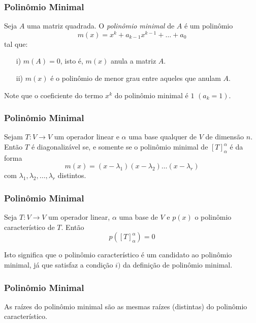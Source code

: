 \documentclass[hyperref={pdfpagelabels=false}]{beamer}
\begin{document}
\begin{frame}
\frametitle{Polinômio Minimal}

\begin{definition}
	Seja $A$ uma matriz quadrada. O \emph{polinômio minimal} de $A$ é um polinômio
	$$m(x) = x^k + a_{k-1}x^{k-1} + \dots + a_0$$
	tal que:
	\begin{enumerate}
		\item [i)] $m(A) = 0$, isto é, $m(x)$ anula a matriz $A$.
		\item [ii)] $m(x)$ é o polinômio de menor grau entre aqueles que anulam $A$.
	\end{enumerate}
	Note que o coeficiente do termo $x^k$ do polinômio minimal é $1$ $(a_k = 1)$.
	
\end{definition}

\end{frame}


\begin{frame}
\frametitle{Polinômio Minimal}

\begin{theorem}
	Sejam $T:V \rightarrow V$ um operador linear e $\alpha$ uma base qualquer de $V$ de dimensão $n$. Então $T$ é diagonalizável se, e somente se o polinômio minimal de $[T]_{\alpha}^{\alpha}$ é da forma
	$$m(x) = (x - \lambda_1)(x - \lambda_2) \dots (x - \lambda_r)$$
	com $\lambda_1, \lambda_2,\dots, \lambda_r$ distintos.
\end{theorem}

\end{frame}


\begin{frame}
\frametitle{Polinômio Minimal}

\begin{theorem}
	Seja $T:V \rightarrow V$ um operador linear, $\alpha$ uma base de $V$ e $p(x)$ o polinômio característico de $T$. Então
	$$p([T]_{\alpha}^{\alpha}) = 0$$
\end{theorem}

\pause

Isto significa que o polinômio característico é um candidato ao polinômio minimal, já que satisfaz a condição $i)$ da definição de polinômio minimal.

\end{frame}


\begin{frame}
\frametitle{Polinômio Minimal}

\begin{theorem}
	As raízes do polinômio minimal são as mesmas raízes (distintas) do polinômio característico.
\end{theorem}

\end{frame}
\end{document}

